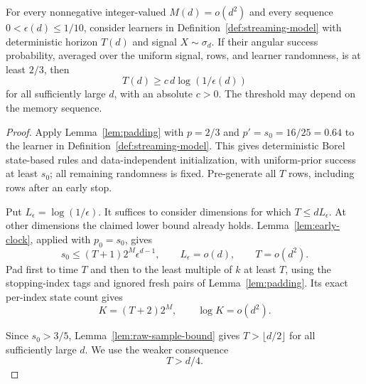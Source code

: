 \begin{proposition}\label{syn:streaming}
For every nonnegative integer-valued \(M(d)=o(d^2)\) and every sequence
\(0<\epsilon(d)\le1/10\), consider learners in
Definition~\ref{def:streaming-model} with deterministic horizon \(T(d)\)
and signal \(X\sim\sigma_d\).  If their angular
success probability, averaged over the uniform signal, rows, and learner
randomness, is at least \(2/3\), then
\[
 T(d)\ge c\,d\log(1/\epsilon(d))
\]
for all sufficiently large \(d\), with an absolute \(c>0\).  The threshold
may depend on the memory sequence.
\end{proposition}

\begin{proof}
Apply Lemma~\ref{lem:padding} with \(p=2/3\) and
\(p'=s_0=16/25=0.64\) to the learner in
Definition~\ref{def:streaming-model}.  This gives deterministic Borel
state-based rules and data-independent initialization, with uniform-prior
success at least \(s_0\); all remaining randomness is fixed.
Pre-generate all \(T\) rows, including rows after an early stop.

Put \(L_\epsilon=\log(1/\epsilon)\).  It suffices to consider dimensions
for which \(T\le dL_\epsilon\).  At other dimensions the claimed lower
bound already holds.  Lemma~\ref{lem:early-clock}, applied with
\(p_0=s_0\), gives
\begin{equation}\label{syn:output-count}
 s_0\le(T+1)2^M\epsilon^{d-1},\qquad
 L_\epsilon=o(d),\qquad T=o(d^2).
\end{equation}
Pad first to time \(T\) and then
to the least multiple of \(k\) at least \(T\), using the stopping-index
tags and ignored fresh pairs of Lemma~\ref{lem:padding}.  Its exact
per-index state count gives
\begin{equation}\label{syn:padded-width}
 K=(T+2)2^M,\qquad \log K=o(d^2).
\end{equation}

Since \(s_0>3/5\), Lemma~\ref{lem:raw-sample-bound} gives
\(T>\lfloor d/2\rfloor\) for all sufficiently large \(d\).  We use the
weaker consequence
\begin{equation}\label{syn:linear-endpoint}
 T>d/4.
\end{equation}


\end{proof}
